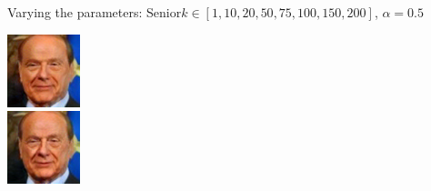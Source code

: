 \documentclass[11pt]{beamer}
\begin{document}
\begin{frame}{Varying the parameters: Senior}{$k \in [1, 10, 20, 50, 75, 100, 150, 200]$, $\alpha=0.5$}
\begin{minipage}{81px}
	\end{minipage}%
	\begin{minipage}{81px}
		\includegraphics[width=80px]{../pictures/outputs/alpha_k/Senior/alpha0.5/Silvio_Berlusconi_0023_alpha-0.5_k-502017-02-07_14-25-20.png}\\
		\includegraphics[width=80px]{../pictures/outputs/alpha_k/Senior/alpha0.5/Silvio_Berlusconi_0023_alpha-0.5_k-2002017-02-07_14-32-10.png}
	\end{minipage}%
\end{frame}
\end{document}
